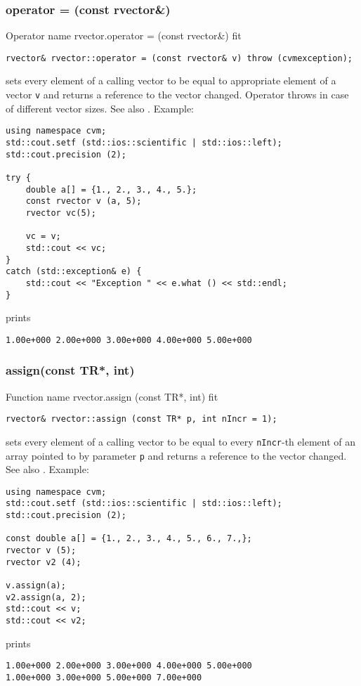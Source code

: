 \subsubsection{operator = (const rvector\&)}
Operator%
\pdfdest name {rvector.operator = (const rvector&)} fit
\begin{verbatim}
rvector& rvector::operator = (const rvector& v) throw (cvmexception);
\end{verbatim}
sets every element of a calling vector to be equal to
appropriate element of a vector \verb"v"
and returns a reference to
the vector changed.
Operator throws  
in case of different vector sizes.
See also .
Example:
\begin{Verbatim}
using namespace cvm;
std::cout.setf (std::ios::scientific | std::ios::left); 
std::cout.precision (2);

try {
    double a[] = {1., 2., 3., 4., 5.};
    const rvector v (a, 5);
    rvector vc(5);

    vc = v;
    std::cout << vc;
}
catch (std::exception& e) {
    std::cout << "Exception " << e.what () << std::endl;
}
\end{Verbatim}
prints
\begin{Verbatim}
1.00e+000 2.00e+000 3.00e+000 4.00e+000 5.00e+000
\end{Verbatim}
\newpage



\subsubsection{assign(const TR*, int)}
Function%
\pdfdest name {rvector.assign (const TR*, int)} fit
\begin{verbatim}
rvector& rvector::assign (const TR* p, int nIncr = 1);
\end{verbatim}
sets every element of a calling vector to be equal to
every \verb"nIncr"-th element of an array  pointed to by parameter \verb"p"
and returns a reference to the vector changed.
See also .
Example:
\begin{Verbatim}
using namespace cvm;
std::cout.setf (std::ios::scientific | std::ios::left); 
std::cout.precision (2);

const double a[] = {1., 2., 3., 4., 5., 6., 7.,};
rvector v (5);
rvector v2 (4);

v.assign(a);
v2.assign(a, 2);
std::cout << v;
std::cout << v2;
\end{Verbatim}
prints
\begin{Verbatim}
1.00e+000 2.00e+000 3.00e+000 4.00e+000 5.00e+000
1.00e+000 3.00e+000 5.00e+000 7.00e+000
\end{Verbatim}
\newpage


